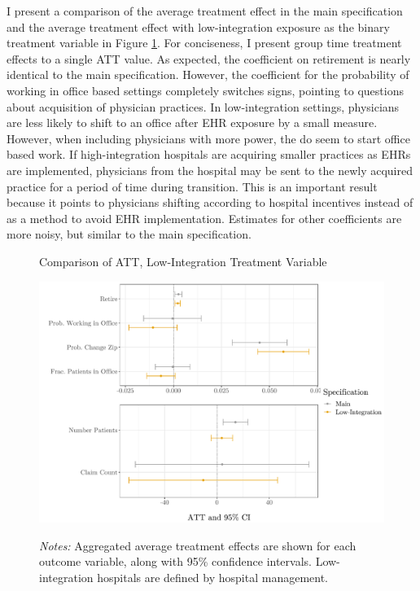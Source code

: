 \documentclass[12pt]{article}
\begin{document}
I present a comparison of the average treatment effect in the main specification and the average treatment effect with low-integration exposure as the binary treatment variable in Figure \ref{fig:LI}. For conciseness, I present group time treatment effects to a single ATT value. As expected, the coefficient on retirement is nearly identical to the main specification. However, the coefficient for the probability of working in office based settings completely switches signs, pointing to questions about acquisition of physician practices. In low-integration settings, physicians are less likely to shift to an office after EHR exposure by a small measure. However, when including physicians with more power, the do seem to start office based work. If high-integration hospitals are acquiring smaller practices as EHRs are implemented, physicians from the hospital may be sent to the newly acquired practice for a period of time during transition. This is an important result because it points to physicians shifting according to hospital incentives instead of as a method to avoid EHR implementation. Estimates for other coefficients are more noisy, but similar to the main specification. 

\begin{figure}[ht]
    \centering
    \captionsetup{width=.57\linewidth}
    \caption{Comparison of ATT, Low-Integration Treatment Variable}
    \includegraphics[scale=.57]{Objects/LI_graph.pdf}
    \label{fig:LI}
    \vspace{2mm}
    \caption*{\footnotesize{\textit{Notes:} Aggregated average treatment effects are shown for each outcome variable, along with 95\% confidence intervals. Low-integration hospitals are defined by hospital management.}}
\end{figure}
\end{document}

